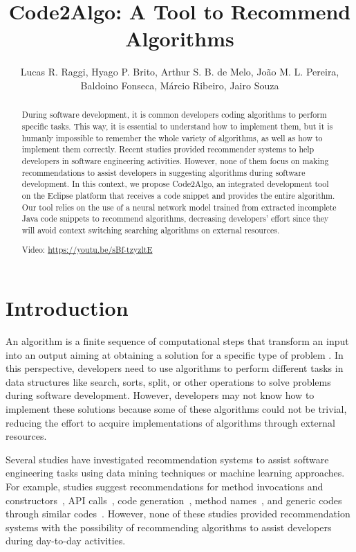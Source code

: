 \documentclass[12pt]{article}
\title{Code2Algo: A Tool to Recommend Algorithms}
\author{Lucas R. Raggi, Hyago P. Brito, Arthur S. B. de Melo, João M. L. Pereira, \\Baldoino Fonseca, Márcio Ribeiro, Jairo Souza}
\begin{document}
 

\maketitle

\begin{abstract}

    During software development, it is common developers coding algorithms to perform specific tasks. This way, it is essential to understand how to implement them, but it is humanly impossible to remember the whole variety of algorithms, as well as how to implement them correctly. Recent studies provided recommender systems to help developers in software engineering activities. However, none of them focus on making recommendations to assist developers in suggesting algorithms during software development. In this context, we propose Code2Algo, an integrated development tool on the Eclipse platform that receives a code snippet and provides the entire algorithm. Our tool relies on the use of a neural network model trained from extracted incomplete Java code snippets to recommend algorithms, decreasing developers' effort since they will avoid context switching searching algorithms on external resources.
     
     Video: \url{https://youtu.be/sBf-tzyzltE}

\end{abstract}  

\section{Introduction}
  

     An algorithm is a finite sequence of computational steps that transform an input into an output aiming at obtaining a solution for a specific type of problem \cite{leiserson2002algoritmos}. In this perspective, developers need to use algorithms to perform different tasks in data structures like search, sorts, split, or other operations to solve problems during software development. However, developers may not know how to implement these solutions because some of these algorithms could not be trivial, reducing the effort to acquire implementations of algorithms through external resources.
   

    Several studies have investigated recommendation systems to assist software engineering tasks using data mining techniques or machine learning approaches. For example, studies suggest recommendations for method invocations and constructors~\cite{Bruch2009}, API calls~\cite{Raychev2014}, code generation~\cite{Vijayaraghavan2017Bayou}, method names~\cite{Alon2018Code2vec}, and generic codes through similar codes~\cite{Luan2018Aroma}. However, none of these studies provided recommendation systems with the possibility of recommending algorithms to assist developers during day-to-day activities.
\end{document}
